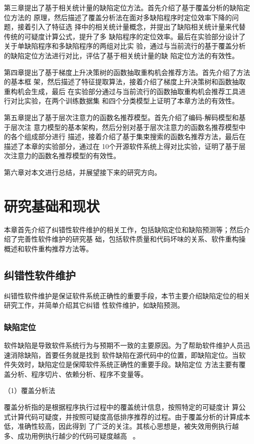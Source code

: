 第三章提出了基于相关统计量的缺陷定位方法。首先介绍了基于覆盖分析的缺陷定位方法的
原理，然后描述了覆盖分析法在面对多缺陷程序时定位效率下降的问题，接着引入了特征选
择中的相关统计量概念，并提出了缺陷相关统计量来代替传统的可疑度计算公式，提升了多
缺陷程序的定位效率。最后在实验部分设计了关于单缺陷程序和多缺陷程序的两组对比实
验，通过与当前流行的基于覆盖分析的缺陷定位方法进行对比，评估了基于相关统计量的缺
陷定位方法的有效性。

第四章提出了基于梯度上升决策树的函数抽取重构机会推荐方法。首先介绍了方法的基本框
架，然后描述了特征提取算法，接着介绍了梯度上升决策树和函数抽取重构机会生成，最后
在实验部分通过与当前流行的函数抽取重构机会推荐工具进行对比实验，在两个训练数据集
和四个分类模型上证明了本章方法的有效性。

第五章提出了基于层次注意力的函数名推荐模型。首先介绍了编码-解码模型和基于层次注
意力模型的基本架构，然后分别对基于层次注意力的函数名推荐模型中的各个组成部分进行
描述，接着介绍了基于集束搜索的函数名推荐方法，最后在描述了本章的实验部分，通过在
10个开源软件系统上得对比实验，证明了基于层次注意力的函数名推荐模型的有效性。

第六章对本文进行总结，并展望接下来的研究方向。

\chapter{研究基础和现状}
本章首先介绍了纠错性软件维护的相关工作，包括缺陷定位和缺陷预测等；然后介绍了完善性软件维护的研究基
础，包括软件质量和代码坏味的关系、软件重构操概述和软件重构推荐方法等。
\section{纠错性软件维护}
纠错性软件维护是保证软件系统正确性的重要手段，本节主要介绍缺陷定位的相关研究工作，并简单介绍其它纠错
性软件维护，如缺陷预测。
\subsection{缺陷定位}
软件缺陷是导致软件系统行为与预期不一致的主要原因。为了帮助软件维护人员迅速消除缺陷，首要任务就是找到
软件缺陷在源代码中的位置，即缺陷定位。当软件失效时，缺陷定位是保障软件系统正确性的重要手段。缺陷定位
方法主要有覆盖分析、程序切片、依赖分析、程序不变量等。

（1）覆盖分析法

覆盖分析指的是根据程序执行过程中的覆盖统计信息，按照特定的可疑度计
算公式计算代码可疑度，并按照可疑度高低排序推荐的过程。由于覆盖分析的计算成本低，准确性较高，因此得到
了广泛的关注。其核心思想是，被失效用例执行越多、成功用例执行越少的代码可疑度越高
~\cite{jones2005empirical}。

